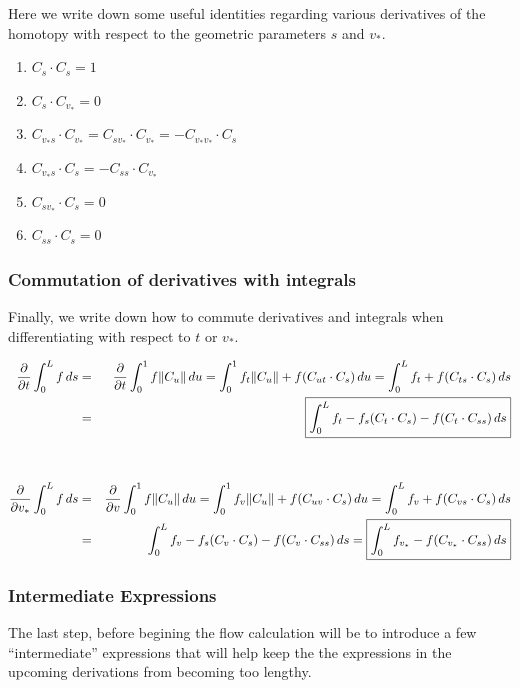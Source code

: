 \documentclass[twoside,a4paper,english]{article}
\def\v{{v_*}}
\newcommand\pderiv[2][]{\frac{\partial #1}{\partial #2}}
\begin{document}
Here we write down some useful identities regarding various
derivatives of the homotopy with respect to the geometric
parameters $s$ and $\v$.

\begin{enumerate}
  \item $C_s\cdot C_s=1$
  \item $C_s\cdot C_{\v}=0$
  \item $C_{\v s}\cdot C_{\v}= C_{s\v}\cdot C_{\v}=-C_{\v\v}\cdot C_s$
  \item $C_{\v s}\cdot C_s=-C_{ss}\cdot C_{\v}$
  \item $C_{s\v}\cdot C_s=0$
  \item $C_{ss}\cdot C_s=0$
\end{enumerate}

\subsubsection{Commutation of derivatives with integrals}

Finally, we write down how to commute derivatives and integrals
when differentiating with respect to $t$ or $\v$.

\begin{eqnarray}
  \pderiv{t}\int_0^L f\,ds
  &=& \nonumber
   \pderiv{t}\int_0^1 f \|C_u\| \,du
  =\int_0^1 f_t \|C_u\|+ f(C_{ut}\cdot C_s)\, du
  =\int_0^L f_t + f(C_{ts}\cdot C_s)\, ds
  \\ &=& \label{eq:int_t}
  \fbox{$\displaystyle
   \int_0^L f_t - f_s(C_t\cdot C_s)- f(C_t\cdot C_{ss})\, ds
  $}
  \\ \nonumber \\ \nonumber \\
  \pderiv{\v}\int_0^L f\,ds
  &=& \nonumber
   \pderiv{v}\int_0^1 f \|C_u\| \,du
  =\int_0^1 f_v \|C_u\|+ f(C_{uv}\cdot C_s)\, du
  =\int_0^L f_v + f(C_{vs}\cdot C_s)\, ds
  \\ &=& \label{eq:int_v}
   \int_0^L f_v - f_s(C_v\cdot C_s)- f(C_v\cdot C_{ss})\, ds
  =\fbox{$\displaystyle
   \int_0^L f_{\v}- f(C_{\v}\cdot C_{ss})\, ds
  $}
\end{eqnarray}

\subsubsection{Intermediate Expressions}

The last step, before begining the flow calculation will be to
introduce a few ``intermediate'' expressions that will help keep the
the expressions in the upcoming derivations from becoming
too lengthy.
\end{document}
